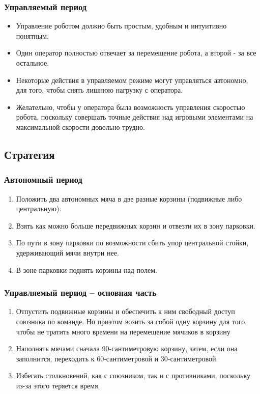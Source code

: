 \subsubsection{Управляемый период}
\begin{itemize}
	\item Управление роботом должно быть простым, удобным и интуитивно понятным.
	\item Один оператор полностью отвечает за перемещение робота, а второй - за все остальное.
	\item Некоторые действия в управляемом режиме могут управляться автономно, для того, чтобы снять лишнюю нагрузку с оператора.
	\item Желательно, чтобы у оператора была возможность управления скоростью робота, поскольку совершать точные действия над игровыми элементами на максимальной скорости довольно трудно.
\end{itemize}

\fillpage

\subsection{Стратегия} 
\subsubsection{Автономный период}
\begin{enumerate}
    \item Положить два автономных мяча в две разные корзины (подвижные либо центральную).
	\item Взять как можно больше передвижных корзин и отвезти их в зону парковки.
	\item По пути в зону парковки по возможности сбить упор центральной стойки, удерживающий мячи внутри нее.
	\item В зоне парковки поднять корзины над полем.         
\end{enumerate}
\subsubsection{Управляемый период -- основная часть}
\begin{enumerate}
	\item Отпустить подвижные корзины и обеспечить к ним свободный доступ союзника по команде. Но приэтом возить за собой одну корзину для того, чтобы не тратить много времени на перемещение мячиков в корзину
	\item Наполнять мячами сначала 90-сантиметровую корзину, затем, если она заполнится, переходить к 60-сантиметровой и 30-сантиметровой.
	\item Избегать столкновений, как с союзником, так и с противниками, поскольку из-за этого теряется время.
\end{enumerate}
